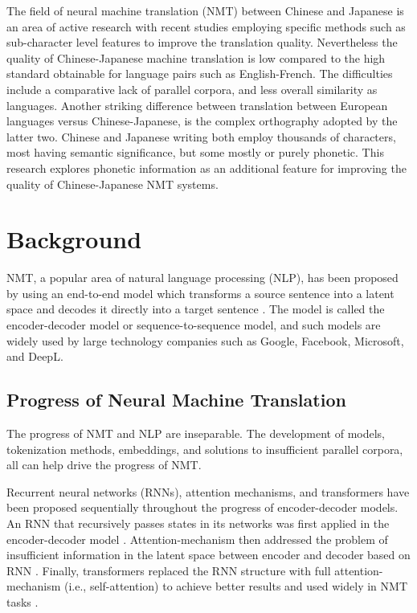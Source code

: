 \hspace{24pt}

The field of neural machine translation (NMT) between Chinese and Japanese is an area of active research with recent studies employing specific methods such as sub-character level features to improve the translation quality. Nevertheless the quality of Chinese-Japanese machine translation is low compared to the high standard obtainable for language pairs such as English-French. The difficulties include a comparative lack of parallel corpora, and less overall similarity as languages. Another striking difference between translation between European languages versus Chinese-Japanese, is the complex orthography adopted by the latter two. Chinese and Japanese writing both employ thousands of characters, most having semantic significance, but some mostly or purely phonetic.
This research explores phonetic information as an additional feature for improving the quality of Chinese-Japanese NMT systems.

\section{Background} \label{sec:background}

NMT, a popular area of natural language processing (NLP), has been proposed by using an end-to-end model which transforms a source sentence into a latent space and decodes it directly into a target sentence \cite{sutskever2014sequence, cho2014learning}. The model is called the encoder-decoder model or sequence-to-sequence model, and such models are widely used by large technology companies such as Google, Facebook, Microsoft, and DeepL.

\subsection{Progress of Neural Machine Translation} \label{sec:nmt}

The progress of NMT and NLP are inseparable. The development of models, tokenization methods, embeddings, and solutions to insufficient parallel corpora, all can help drive the progress of NMT.

Recurrent neural networks (RNNs), attention mechanisms, and transformers have been proposed sequentially throughout the progress of encoder-decoder models. An RNN that recursively passes states in its networks was first applied in the encoder-decoder model \cite{cho2014learning}. Attention-mechanism then addressed the problem of insufficient information in the latent space between encoder and decoder based on RNN \cite{bahdanau2014neural}. Finally, transformers replaced the RNN structure with full attention-mechanism (i.e., self-attention) to achieve better results and used widely in NMT tasks \cite{NIPS2017_3f5ee243}. 


